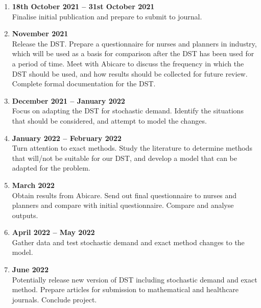 \documentclass[a4paper]{article}
\begin{document}
\begin{enumerate}[leftmargin=*]
	\item \textbf{18th October 2021 -- 31st October 2021}\\
	Finalise initial publication and prepare to submit to journal.
	\item \textbf{November 2021}\\
	Release the DST. Prepare a questionnaire for nurses and planners in industry, which will be used as a basis for comparison after the DST has been used for a period of time. Meet with Abicare to discuss the frequency in which the DST should be used, and how results should be collected for future review. Complete formal documentation for the DST.
	\item \textbf{December 2021 -- January 2022}\\
	Focus on adapting the DST for stochastic demand. Identify the situations that should be considered, and attempt to model the changes.
	\item \textbf{January 2022 -- February 2022}\\
	Turn attention to exact methods. Study the literature to determine methods that will/not be suitable for our DST, and develop a model that can be adapted for the problem.
	\item \textbf{March 2022}\\
	Obtain results from Abicare. Send out final questionnaire to nurses and planners and compare with initial questionnaire. Compare and analyse outputs.
	\item \textbf{April 2022 -- May 2022}\\
	Gather data and test stochastic demand and exact method changes to the model.
	\item \textbf{June 2022}\\
	Potentially release new version of DST including stochastic demand and exact method. Prepare articles for submission to mathematical and healthcare journals. Conclude project.
\end{enumerate}	
\end{document}
